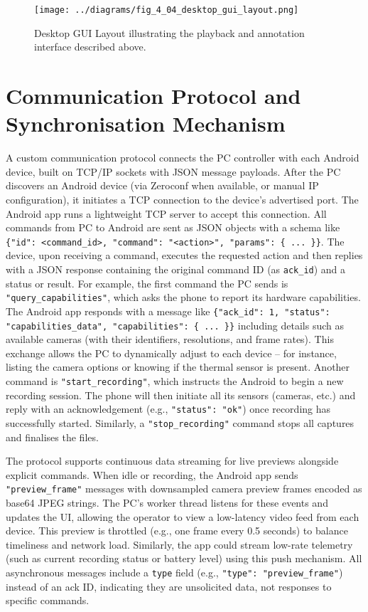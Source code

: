 \begin{figure}[htbp]
    \centring
    \texttt{[image: ../diagrams/fig\_4\_04\_desktop\_gui\_layout.png]}
    \caption{Desktop GUI Layout illustrating the playback and annotation interface described above.}
    \label{fig:4_04_desktop_gui_layout}
\end{figure}


\section{Communication Protocol and Synchronisation Mechanism}\label{sec:4-4}
A custom communication protocol connects the PC controller with each Android device, built on TCP/IP sockets \cite{ref21} with JSON message payloads. After the PC discovers an Android device (via Zeroconf when available, or manual IP configuration), it initiates a TCP connection to the device's advertised port. The Android app runs a lightweight TCP server to accept this connection. All commands from PC to Android are sent as JSON objects with a schema like \texttt{\{"id": <command\_id>, "command": "<action>", "params": \{ ... \}\}}. The device, upon receiving a command, executes the requested action and then replies with a JSON response containing the original command ID (as \texttt{ack\_id}) and a status or result. For example, the first command the PC sends is \texttt{"query\_capabilities"}, which asks the phone to report its hardware capabilities. The Android app responds with a message like \texttt{\{"ack\_id": 1, "status": "capabilities\_data", "capabilities": \{ ... \}\}} including details such as available cameras (with their identifiers, resolutions, and frame rates). This exchange allows the PC to dynamically adjust to each device -- for instance, listing the camera options or knowing if the thermal sensor is present. Another command is \texttt{"start\_recording"}, which instructs the Android to begin a new recording session. The phone will then initiate all its sensors (cameras, etc.) and reply with an acknowledgement (e.g., \texttt{"status": "ok"}) once recording has successfully started. Similarly, a \texttt{"stop\_recording"} command stops all captures and finalises the files.

The protocol supports continuous data streaming for live previews alongside explicit commands. When idle or recording, the Android app sends \texttt{"preview\_frame"} messages with downsampled camera preview frames encoded as base64 JPEG strings. The PC's worker thread listens for these events and updates the UI, allowing the operator to view a low-latency video feed from each device. This preview is throttled (e.g., one frame every 0.5 seconds) to balance timeliness and network load. Similarly, the app could stream low-rate telemetry (such as current recording status or battery level) using this push mechanism. All asynchronous messages include a \texttt{type} field (e.g., \texttt{"type": "preview\_frame"}) instead of an ack ID, indicating they are unsolicited data, not responses to specific commands.

